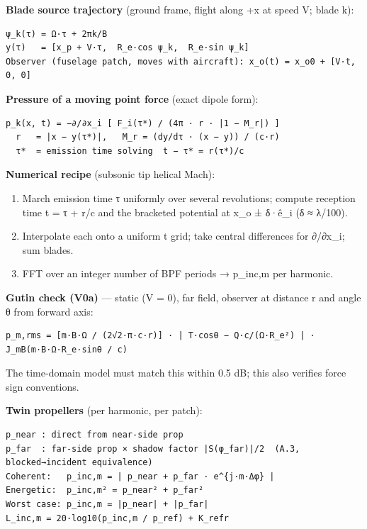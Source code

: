 \documentclass[10pt,a4paper]{article}
\begin{document}
\textbf{Blade source trajectory} (ground frame, flight along +x at speed V; blade k):

\begin{Verbatim}[breaklines,fontsize=\small,frame=single,rulecolor=\color{gray}]
ψ_k(τ) = Ω·τ + 2πk/B
y(τ)   = [x_p + V·τ,  R_e·cos ψ_k,  R_e·sin ψ_k]
Observer (fuselage patch, moves with aircraft): x_o(t) = x_o0 + [V·t, 0, 0]
\end{Verbatim}

\textbf{Pressure of a moving point force} (exact dipole form):

\begin{Verbatim}[breaklines,fontsize=\small,frame=single,rulecolor=\color{gray}]
p_k(x, t) = −∂/∂x_i [ F_i(τ*) / (4π · r · |1 − M_r|) ]
  r   = |x − y(τ*)|,   M_r = (dy/dτ · (x − y)) / (c·r)
  τ*  = emission time solving  t − τ* = r(τ*)/c
\end{Verbatim}

\textbf{Numerical recipe} (subsonic tip helical Mach):

\begin{enumerate}
\item March emission time τ uniformly over several revolutions; compute reception time t = τ + r/c and the bracketed potential at x\_o ± δ·ê\_i (δ ≈ λ/100).
\item Interpolate each onto a uniform t grid; take central differences for ∂/∂x\_i; sum blades.
\item FFT over an integer number of BPF periods → p\_inc,m per harmonic.
\end{enumerate}

\textbf{Gutin check (V0a)} — static (V = 0), far field, observer at distance r and angle θ from forward axis:

\begin{Verbatim}[breaklines,fontsize=\small,frame=single,rulecolor=\color{gray}]
p_m,rms = [m·B·Ω / (2√2·π·c·r)] · | T·cosθ − Q·c/(Ω·R_e²) | · J_mB(m·B·Ω·R_e·sinθ / c)
\end{Verbatim}

The time-domain model must match this within 0.5 dB; this also verifies force sign conventions.

\textbf{Twin propellers} (per harmonic, per patch):

\begin{Verbatim}[breaklines,fontsize=\small,frame=single,rulecolor=\color{gray}]
p_near : direct from near-side prop
p_far  : far-side prop × shadow factor |S(φ_far)|/2  (A.3, blocked→incident equivalence)
Coherent:   p_inc,m = | p_near + p_far · e^{j·m·Δφ} |
Energetic:  p_inc,m² = p_near² + p_far²
Worst case: p_inc,m = |p_near| + |p_far|
L_inc,m = 20·log10(p_inc,m / p_ref) + K_refr
\end{Verbatim}
\end{document}
